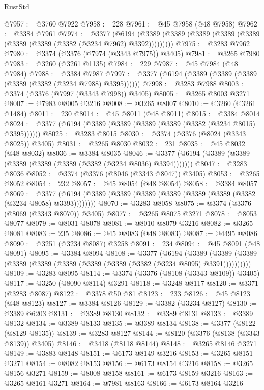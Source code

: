 \begin{lexlean}{RustStd}
\begin{coremodule}
@7957 := @3760 @7922
@7958 := 228
@7961 := @45 @7958 (@48 @7958)
@7962 := @3384 @7961
@7974 := @3377
    (@6194 (@3389 (@3389 (@3389 (@3389 (@3389 (@3389 (@3389 (@3382 (@3234 @7962) @3392)))))))))
@7975 := @3283 @7962
@7980 := @3374 (@3376 (@7974 (@3343 @7975)) @3405)
@7981 := @3265 @7980
@7983 := @3260 (@3261 @1135)
@7984 := 229
@7987 := @45 @7984 (@48 @7984)
@7988 := @3384 @7987
@7997 := @3377 (@6194 (@3389 (@3389 (@3389 (@3389 (@3382 (@3234 @7988) @3395))))))
@7998 := @3283 @7988
@8003 := @3374 (@3376 (@7997 (@3343 @7998)) @3405)
@8005 := @3265 @8003 @3271
@8007 := @7983 @8005 @3216
@8008 := @3265 @8007
@8010 := @3260 (@3261 @1484)
@8011 := 230
@8014 := @45 @8011 (@48 @8011)
@8015 := @3384 @8014
@8024 := @3377 (@6194 (@3389 (@3389 (@3389 (@3389 (@3382 (@3234 @8015) @3395))))))
@8025 := @3283 @8015
@8030 := @3374 (@3376 (@8024 (@3343 @8025)) @3405)
@8031 := @3265 @8030
@8032 := 231
@8035 := @45 @8032 (@48 @8032)
@8036 := @3384 @8035
@8046 := @3377 (@6194 (@3389 (@3389 (@3389 (@3389 (@3389 (@3382 (@3234 @8036) @3394)))))))
@8047 := @3283 @8036
@8052 := @3374 (@3376 (@8046 (@3343 @8047)) @3405)
@8053 := @3265 @8052
@8054 := 232
@8057 := @45 @8054 (@48 @8054)
@8058 := @3384 @8057
@8069 := @3377 (@6194 (@3389 (@3389 (@3389 (@3389 (@3389 (@3389 (@3382 (@3234 @8058) @3393))))))))
@8070 := @3283 @8058
@8075 := @3374 (@3376 (@8069 (@3343 @8070)) @3405)
@8077 := @3265 @8075 @3271
@8078 := @8053 @8077
@8079 := @8031 @8078
@8081 := @8010 @8079 @3216
@8082 := @3265 @8081
@8083 := 235
@8086 := @45 @8083 (@48 @8083)
@8087 := @4495 @8086
@8090 := @3251 (@3234 @8087) @3258
@8091 := 234
@8094 := @45 @8091 (@48 @8091)
@8095 := @3384 @8094
@8108 := @3377
    (@6194
      (@3389 (@3389 (@3389 (@3389 (@3389 (@3389 (@3389 (@3389 (@3382 (@3234 @8095) @3391))))))))))
@8109 := @3283 @8095
@8114 := @3374 (@3376 (@8108 (@3343 @8109)) @3405)
@8117 := @3250 (@8090 @8114) @3291
@8118 := @3248 @8117
@8120 := @3371 (@3283 @8087)
@8122 := @3378 @50 @81
@8123 := 233
@8126 := @45 @8123 (@48 @8123)
@8127 := @3384 @8126
@8129 := @3382 (@3234 @8127)
@8130 := @3389 @6203
@8131 := @3389 @8130
@8132 := @3389 @8131
@8133 := @3389 @8132
@8134 := @3389 @8133
@8135 := @3389 @8134
@8138 := @3377 (@8122 (@8129 @8135))
@8139 := @3283 @8127
@8144 := @8120 (@3376 (@8138 (@3343 @8139)) @3405)
@8146 := @3418 (@8118 @8144)
@8148 := @3265 @8146 @3271
@8149 := @3883 @8148
@8151 := @6173 @8149 @3216
@8153 := @3265 @8151 @3271
@8154 := @8082 @8153
@8156 := @6173 @8154 @3216
@8158 := @3265 @8156 @3271
@8159 := @8008 @8158
@8161 := @6173 @8159 @3216
@8163 := @3265 @8161 @3271
@8164 := @7981 @8163
@8166 := @6173 @8164 @3216

\end{coremodule}
\end{lexlean}

